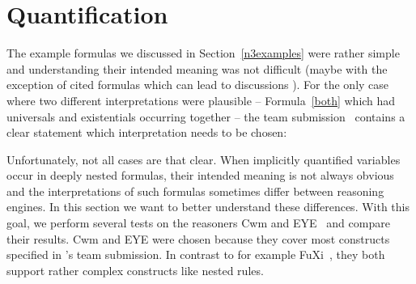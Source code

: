 \section{Quantification}\label{quantsec}
The example formulas we discussed in Section~\ref{n3examples} were rather simple and understanding their intended meaning was not 
 difficult (maybe with the exception of cited formulas which can lead to discussions \cite{TriGsemantics}). For the only case where 
two different interpretations were plausible -- Formula~\ref{both} which had universals and existentials occurring together --
the \wwwc team submission~\cite{Notation3} contains a clear statement which interpretation needs to be chosen: \\


Unfortunately, not all cases are that clear.
% 
% 
%
When implicitly quantified variables occur in deeply nested formulas, 
 their intended meaning is not always obvious and the interpretations of such formulas sometimes differ between reasoning engines. 
%
In this section we want to better understand these differences. 
With this goal, we perform several tests on the reasoners Cwm \cite{cwm} and EYE~\cite{eyepaper} and compare their results. 
Cwm and EYE were chosen because they cover most constructs specified in \nthree{}'s \wwwc team submission. 
In contrast to for example FuXi~\cite{fuxi}, they both support rather complex constructs like nested rules. 



